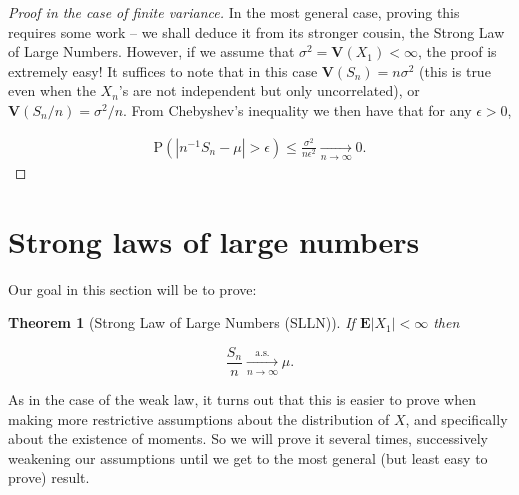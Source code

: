 \documentclass[11pt]{report}
\theoremstyle{plain}
\newtheorem{thm}{Theorem}[chapter]
\theoremstyle{definition}
\begin{document}
\begin{proof}[Proof in the case of finite variance]
In the most general case, proving this requires some
work -- we shall deduce it from its stronger cousin,
the Strong Law of Large Numbers. However, if we assume
that $\sigma^2 = \mathbf{V}(X_1)<\infty$, the proof
is extremely easy! It suffices to note that in this
case $\mathbf{V}(S_n) = n \sigma^2$ (this is true
even when the $X_n$'s are not independent but only
uncorrelated), or $\mathbf{V}(S_n/n) = \sigma^2/n$.
From Chebyshev's inequality we then have that for any
$\epsilon>0$,

\begin{align*}
\tag{7}\label{eq:variancebound}
\mathrm{P}(|n^{-1} S_n - \mu|>\epsilon) \le \frac{\sigma^2}{n \epsilon^2} \xrightarrow[n\to\infty]{} 0.
\end{align*}

\end{proof}

\section{Strong laws of large numbers}

Our goal in this section will be to prove:

\begin{thm}[Strong Law of Large Numbers (SLLN)]
\label{thm-slln}
If $\mathbf{E}|X_1|<\infty$ then

\[
\frac{S_n}{n} \xrightarrow[n\to\infty]{\textrm{a.s.}} \mu.
\]

\end{thm}

\noindent As in the case of the weak law, it turns out that
this is easier to prove when making more restrictive
assumptions about the distribution of $X$, and
specifically about the existence of moments. So we
will prove it several times, successively weakening
our assumptions until we get to the most general (but
least easy to prove) result.
\end{document}
